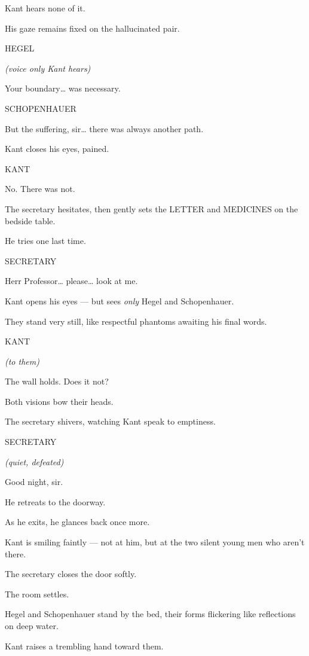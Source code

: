 \documentclass[12pt]{article}
\newenvironment{dialogue}[1]{%
  \vspace{0.8\baselineskip}%
  \noindent\hspace*{2.3in}\textsc{#1}\par%
  \noindent\hspace*{1.5in}\begin{minipage}[t]{4.5in}%
}{%
  \end{minipage}\par%
}
\newcommand{\paren}[1]{%
  \noindent\hspace*{1.8in}\textit{(#1)}\par%
}
\begin{document}
Kant hears none of it.

His gaze remains fixed on the hallucinated pair.

\begin{dialogue}{HEGEL}
\paren{voice only Kant hears}
Your boundary… was necessary.
\end{dialogue}

\begin{dialogue}{SCHOPENHAUER}
But the suffering, sir…
there was always another path.
\end{dialogue}

Kant closes his eyes, pained.

\begin{dialogue}{KANT}
No.
There was not.
\end{dialogue}

The secretary hesitates, then gently sets the LETTER and MEDICINES on the bedside table.

He tries one last time.

\begin{dialogue}{SECRETARY}
Herr Professor…
please… look at me.
\end{dialogue}

Kant opens his eyes — but sees \emph{only} Hegel and Schopenhauer.

They stand very still, like respectful phantoms awaiting his final words.

\begin{dialogue}{KANT}
\paren{to them}
The wall holds.
Does it not?
\end{dialogue}

Both visions bow their heads.

The secretary shivers, watching Kant speak to emptiness.

\begin{dialogue}{SECRETARY}
\paren{quiet, defeated}
Good night, sir.
\end{dialogue}

He retreats to the doorway.

As he exits, he glances back once more.

Kant is smiling faintly — not at him, but at the two silent young men who aren’t there.

The secretary closes the door softly.

The room settles.

Hegel and Schopenhauer stand by the bed, their forms flickering like reflections on deep water.

Kant raises a trembling hand toward them.
\end{document}
